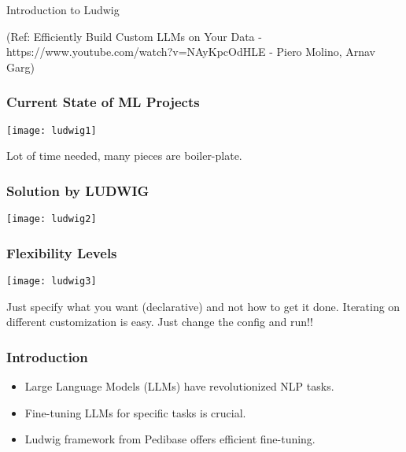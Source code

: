 \begin{frame}[fragile]\frametitle{}
\begin{center}
{\Large Introduction to Ludwig}

{\tiny (Ref: Efficiently Build Custom LLMs on Your Data - https://www.youtube.com/watch?v=NAyKpcOdHLE - Piero Molino,  Arnav Garg)}

\end{center}
\end{frame}


\begin{frame}[fragile]\frametitle{Current State of ML Projects}


		\begin{center}
		\texttt{[image: ludwig1]}
		\end{center}

Lot of time needed, many pieces are boiler-plate.
\end{frame}


\begin{frame}[fragile]\frametitle{Solution by LUDWIG}


		\begin{center}
		\texttt{[image: ludwig2]}
		\end{center}

\end{frame}

\begin{frame}[fragile]\frametitle{Flexibility Levels}


		\begin{center}
		\texttt{[image: ludwig3]}
		\end{center}

Just specify what you want (declarative) and not how to get it done.
Iterating on different customization is easy. Just change the config and run!!

\end{frame}


\begin{frame}[fragile]\frametitle{Introduction}
    \begin{itemize}
        \item Large Language Models (LLMs) have revolutionized NLP tasks.
        \item Fine-tuning LLMs for specific tasks is crucial.
        \item Ludwig framework from Pedibase offers efficient fine-tuning.
    \end{itemize}
\end{frame}



